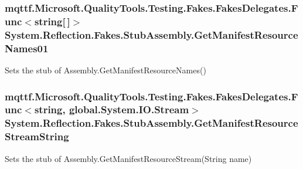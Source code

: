 \hypertarget{class_system_1_1_reflection_1_1_fakes_1_1_stub_assembly_a966b734d1191b6d92f56bb30e92ce792}{
\subsubsection[{Get\-Manifest\-Resource\-Names01}]{\setlength{\rightskip}{0pt plus 5cm}mqttf.\-Microsoft.\-Quality\-Tools.\-Testing.\-Fakes.\-Fakes\-Delegates.\-Func$<$string\mbox{[}$\,$\mbox{]}$>$ System.\-Reflection.\-Fakes.\-Stub\-Assembly.\-Get\-Manifest\-Resource\-Names01}}\label{class_system_1_1_reflection_1_1_fakes_1_1_stub_assembly_a966b734d1191b6d92f56bb30e92ce792}


Sets the stub of Assembly.\-Get\-Manifest\-Resource\-Names()

\hypertarget{class_system_1_1_reflection_1_1_fakes_1_1_stub_assembly_a27bf52115cb07995f03357f20a29cee5}{
\subsubsection[{Get\-Manifest\-Resource\-Stream\-String}]{\setlength{\rightskip}{0pt plus 5cm}mqttf.\-Microsoft.\-Quality\-Tools.\-Testing.\-Fakes.\-Fakes\-Delegates.\-Func$<$string, global.\-System.\-I\-O.\-Stream$>$ System.\-Reflection.\-Fakes.\-Stub\-Assembly.\-Get\-Manifest\-Resource\-Stream\-String}}\label{class_system_1_1_reflection_1_1_fakes_1_1_stub_assembly_a27bf52115cb07995f03357f20a29cee5}


Sets the stub of Assembly.\-Get\-Manifest\-Resource\-Stream(\-String name)

